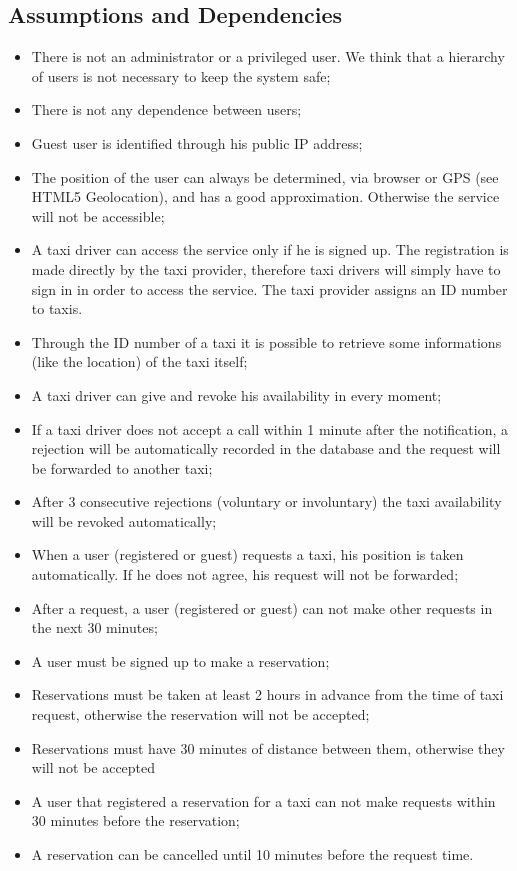 	\subsection{Assumptions and Dependencies}
		\begin{itemize}
			\item There is not an administrator or a privileged user. We think that a hierarchy of users is not
			necessary to keep the system safe;
			\item There is not any dependence between users;
			\item Guest user is identified through his public IP address;
			\item The position of the user can always be determined, via browser or GPS
			(see HTML5 Geolocation), and has a good approximation. Otherwise the service will not
			be accessible;
			\item A taxi driver can access the service only if he is signed up. The registration is made directly by the taxi 
			provider, therefore taxi drivers will simply have to sign in in order to access the service. The taxi provider
			assigns an ID number to taxis.
			\item Through the ID number of a taxi it is possible to retrieve some informations (like
			the location) of the taxi itself;
			\item A taxi driver can give and revoke his availability in every moment;
			\item If a taxi driver does not accept a call within 1 minute after the notification,
			a rejection will be automatically recorded in the database and the request will be
			forwarded to another taxi;
			\item After 3 consecutive rejections (voluntary or involuntary) the taxi availability
			will be revoked automatically;
			\item When a user (registered or guest) requests a taxi, his position is taken automatically.
			If he does not agree, his request will not be forwarded;
			\item After a request, a user (registered or guest) can not make other requests in the next 30 minutes;
			\item A user must be signed up to make a reservation;
			\item Reservations must be taken at least 2 hours in advance from the time of taxi request,
			otherwise the reservation will not be accepted;
			\item Reservations must have 30 minutes of distance between them, otherwise they will not be accepted
			\item A user that registered a reservation for a taxi can not make requests within 30 minutes
			before the reservation;
			\item A reservation can be cancelled until 10 minutes before the request time.
		\end{itemize}
